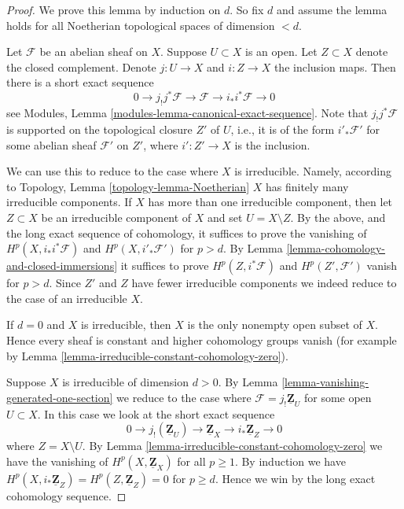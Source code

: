 \begin{proof}
We prove this lemma by induction on $d$.
So fix $d$ and assume the lemma holds for all
Noetherian topological spaces of dimension $< d$.

\medskip\noindent
Let $\mathcal{F}$ be an abelian sheaf on $X$.
Suppose $U \subset X$ is an open. Let $Z \subset X$
denote the closed complement.
Denote $j : U \to X$ and $i : Z \to X$ the inclusion maps.
Then there is a short exact sequence
$$
0 \to j_{!}j^*\mathcal{F} \to \mathcal{F} \to i_*i^*\mathcal{F} \to 0
$$
see Modules, Lemma \ref{modules-lemma-canonical-exact-sequence}.
Note that $j_!j^*\mathcal{F}$ is supported on
the topological closure $Z'$ of $U$, i.e., it is of
the form $i'_*\mathcal{F}'$ for some abelian sheaf $\mathcal{F}'$
on $Z'$, where $i' : Z' \to X$ is the inclusion.

\medskip\noindent
We can use this to reduce to the case where $X$ is irreducible.
Namely, according to
Topology, Lemma \ref{topology-lemma-Noetherian}
$X$ has finitely
many irreducible components. If $X$ has more than one irreducible
component, then let $Z \subset X$ be an irreducible component of $X$
and set $U = X \setminus Z$. By the above, and the long exact sequence
of cohomology, it suffices to prove the vanishing of
$H^p(X, i_*i^*\mathcal{F})$ and $H^p(X, i'_*\mathcal{F}')$ for $p > d$.
By Lemma \ref{lemma-cohomology-and-closed-immersions} it suffices to prove
$H^p(Z, i^*\mathcal{F})$ and $H^p(Z', \mathcal{F}')$ vanish for $p > d$.
Since $Z'$ and $Z$ have fewer irreducible components we indeed
reduce to the case of an irreducible $X$.

\medskip\noindent
If $d = 0$ and $X$ is irreducible, then $X$ is the only nonempty
open subset of $X$. Hence every sheaf is constant and higher cohomology
groups vanish (for example by
Lemma \ref{lemma-irreducible-constant-cohomology-zero}).

\medskip\noindent
Suppose $X$ is irreducible of dimension $d > 0$.
By Lemma \ref{lemma-vanishing-generated-one-section}
we reduce to the case where
$\mathcal{F} = j_!\underline{\mathbf{Z}}_U$ for some open $U \subset X$.
In this case we look at the short exact sequence
$$
0 \to j_!(\underline{\mathbf{Z}}_U) \to
\underline{\mathbf{Z}}_X \to i_*\underline{\mathbf{Z}}_Z \to 0
$$
where $Z = X \setminus U$.
By Lemma \ref{lemma-irreducible-constant-cohomology-zero}
we have the vanishing of $H^p(X, \underline{\mathbf{Z}}_X)$
for all $p \geq 1$. By induction we have
$H^p(X, i_*\underline{\mathbf{Z}}_Z) = H^p(Z, \underline{\mathbf{Z}}_Z) = 0$
for $p \geq d$. Hence we win by the long exact cohomology sequence.
\end{proof}





